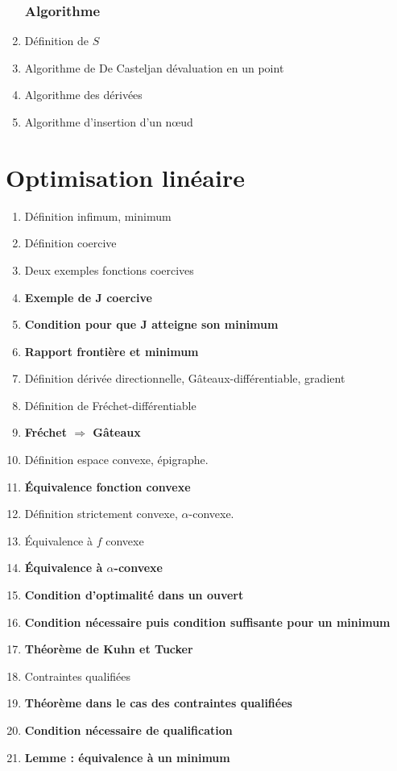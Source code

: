 \documentclass{article}
\begin{document}
\begin{enumerate}
\section{Algorithme}
\item Définition de $S$
\item Algorithme de De Casteljan dévaluation en un point
\item Algorithme des dérivées
\item Algorithme d'insertion d'un n\oe ud
\end{enumerate}

\part{Optimisation linéaire}
\begin{enumerate}
\item Définition infimum, minimum
\item Définition coercive
\item Deux exemples fonctions coercives
\item \textbf{Exemple de J coercive}
\item \textbf{Condition pour que J atteigne son minimum}
\item \textbf{Rapport frontière et minimum}
\item Définition dérivée directionnelle, Gâteaux-différentiable, gradient
\item Définition de Fréchet-différentiable
\item \textbf{Fréchet $\Rightarrow$ Gâteaux}
\item Définition espace convexe, épigraphe.
\item \textbf{Équivalence fonction convexe}
\item Définition strictement convexe, $\alpha$-convexe.
\item Équivalence à $f$ convexe
\item \textbf{Équivalence à $\alpha$-convexe}
\item \textbf{Condition d'optimalité dans un ouvert}
\item \textbf{Condition nécessaire puis condition suffisante pour un minimum}
\item \textbf{Théorème de Kuhn et Tucker}
\item Contraintes qualifiées
\item \textbf{Théorème dans le cas des contraintes qualifiées}
\item \textbf{Condition nécessaire de qualification}
\item \textbf{Lemme : équivalence à un minimum}

\end{enumerate}
\end{document}
